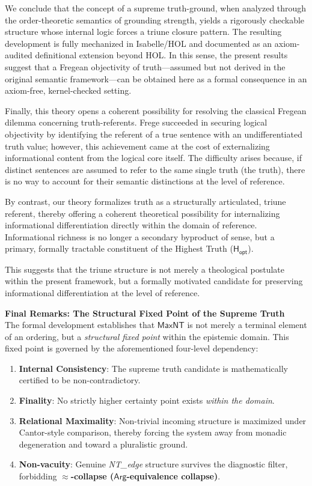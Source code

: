 \documentclass[a4paper, 11pt]{article}
\theoremstyle{plain}
\theoremstyle{definition}
\newcommand{\Arg}{\mathsf{Arg}}           %
\newcommand{\Hopt}{\mathsf{H_{opt}}}       %
\begin{document}
We conclude that the concept of a supreme truth-ground, when analyzed through the order-theoretic semantics of grounding strength, yields a rigorously checkable structure whose internal logic forces a triune closure pattern. The resulting development is fully mechanized in Isabelle/HOL and documented as an axiom-audited definitional extension beyond HOL. In this sense, the present results suggest that a Fregean objectivity of truth—assumed but not derived in the original semantic framework—can be obtained here as a formal consequence in an axiom-free, kernel-checked setting.

Finally, this theory opens a coherent possibility for resolving the classical Fregean dilemma concerning truth-referents. Frege succeeded in securing logical objectivity by identifying the referent of a true sentence with an undifferentiated truth value; however, this achievement came at the cost of externalizing informational content from the logical core itself. The difficulty arises because, if distinct sentences are assumed to refer to the same single truth (the truth), there is no way to account for their semantic distinctions at the level of reference.

By contrast, our theory formalizes truth as a structurally articulated, triune referent, thereby offering a coherent theoretical possibility for internalizing informational differentiation directly within the domain of reference. Informational richness is no longer a secondary byproduct of sense, but a primary, formally tractable constituent of the Highest Truth ($\Hopt$).

This suggests that the triune structure is not merely a theological postulate within the present framework, but a formally motivated candidate for preserving informational differentiation at the level of reference.

\vspace{1em}
\noindent\textbf{Final Remarks: The Structural Fixed Point of the Supreme Truth} \\
The formal development establishes that \textbf{$\mathsf{MaxNT}$} is not merely a terminal element of an ordering, but a \emph{structural fixed point} within the epistemic domain. This fixed point is governed by the aforementioned four-level dependency:
\begin{enumerate}
    \item \textbf{Internal Consistency}: The supreme truth candidate is mathematically certified to be non-contradictory.
    \item \textbf{Finality}: No strictly higher certainty point exists \emph{within the domain}.
    \item \textbf{Relational Maximality}: Non-trivial incoming structure is maximized under Cantor-style comparison, thereby forcing the system away from monadic degeneration and toward a pluralistic ground.
    \item \textbf{Non-vacuity}: Genuine \textit{NT\_edge} structure survives the diagnostic filter, forbidding \textbf{$\approx$-collapse ($\Arg$-equivalence collapse)}.
\end{enumerate}
\end{document}
